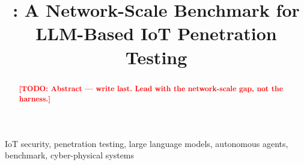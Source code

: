 \documentclass[conference,compsoc]{IEEEtran}
\title{\systemname: A Network-Scale Benchmark for LLM-Based IoT Penetration Testing}
\author{\IEEEauthorblockN{Anonymous Authors}
\IEEEauthorblockA{Paper~\#XXXX, Anonymized for Double-Blind Review}}
\newcommand{\todo}[1]{\textcolor{red}{\textbf{[TODO: #1]}}}
\begin{document}
\maketitle

\begin{abstract}
\todo{Abstract — write last. Lead with the network-scale gap, not the harness.}
\end{abstract}

\begin{IEEEkeywords}
IoT security, penetration testing, large language models, autonomous agents,
benchmark, cyber-physical systems
\end{IEEEkeywords}
















\end{document}

